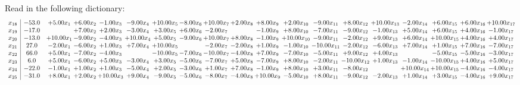 \documentclass[9pt]{article}
\begin{document}
Read in the following dictionary:
\[\begin{array}{c| c c@{\hskip 2pt} c@{\hskip 2pt} c@{\hskip 2pt} c@{\hskip 2pt} c@{\hskip 2pt} c@{\hskip 2pt} c@{\hskip 2pt} c@{\hskip 2pt} c@{\hskip 2pt} c@{\hskip 2pt} c@{\hskip 2pt} c@{\hskip 2pt} c@{\hskip 2pt} c@{\hskip 2pt} c@{\hskip 2pt} c@{\hskip 2pt} c@{\hskip 2pt} }
 x_{18}   &  -53.0 & +  5.00 x_{1} & +  6.00 x_{2} & -1.00 x_{3} & -9.00 x_{4} & + 10.00 x_{5} & -8.00 x_{6} & + 10.00 x_{7} & +  2.00 x_{8} & +  8.00 x_{9} & +  2.00 x_{10} & -9.00 x_{11} & +  8.00 x_{12} & + 10.00 x_{13} & -2.00 x_{14} & +  6.00 x_{15} & +  6.00 x_{16} & + 10.00 x_{17}\\
 x_{19}   &  -17.0  &   & +  7.00 x_{2} & +  2.00 x_{3} & -3.00 x_{4} & +  3.00 x_{5} & +  6.00 x_{6} & -2.00 x_{7} &   & -1.00 x_{9} & +  8.00 x_{10} & -7.00 x_{11} & -9.00 x_{12} & -1.00 x_{13} & +  5.00 x_{14} & +  6.00 x_{15} & +  4.00 x_{16} & -1.00 x_{17}\\
 x_{20}   &  -13.0 & + 10.00 x_{1} & -9.00 x_{2} & -4.00 x_{3} & + 10.00 x_{4} & +  5.00 x_{5} & -9.00 x_{6} & + 10.00 x_{7} & +  8.00 x_{8} & -1.00 x_{9} & + 10.00 x_{10} & -9.00 x_{11} & -2.00 x_{12} & +  9.00 x_{13} & +  6.00 x_{14} & + 10.00 x_{15} & +  4.00 x_{16} & +  4.00 x_{17}\\
 x_{21}   &  27.0 & -2.00 x_{1} & -6.00 x_{2} & +  1.00 x_{3} & +  7.00 x_{4} & + 10.00 x_{5} &   & -2.00 x_{7} & -2.00 x_{8} & +  1.00 x_{9} & -1.00 x_{10} & -10.00 x_{11} & -2.00 x_{12} & -6.00 x_{13} & +  7.00 x_{14} & +  1.00 x_{15} & +  7.00 x_{16} & -7.00 x_{17}\\
 x_{22}   &  66.0 & +  5.00 x_{1} & -7.00 x_{2} & -4.00 x_{3} &   & -10.00 x_{5} & -7.00 x_{6} & -10.00 x_{7} & -4.00 x_{8} & +  7.00 x_{9} & -7.00 x_{10} & -5.00 x_{11} & +  9.00 x_{12} & +  4.00 x_{13} &   & -5.00 x_{15} & -5.00 x_{16} & -3.00 x_{17}\\
 x_{23}   &  6.0 & +  5.00 x_{1} & -6.00 x_{2} & +  5.00 x_{3} & -3.00 x_{4} & +  3.00 x_{5} & -5.00 x_{6} & -7.00 x_{7} & +  5.00 x_{8} & -7.00 x_{9} & +  8.00 x_{10} & -2.00 x_{11} & -10.00 x_{12} & +  1.00 x_{13} & -1.00 x_{14} & -10.00 x_{15} & +  4.00 x_{16} & +  5.00 x_{17}\\
 x_{24}   &  -22.0 & -1.00 x_{1} & +  1.00 x_{2} & +  1.00 x_{3} & -5.00 x_{4} & +  2.00 x_{5} & -3.00 x_{6} & +  1.00 x_{7} & +  7.00 x_{8} & -1.00 x_{9} & +  8.00 x_{10} & +  3.00 x_{11} & -8.00 x_{12} &   & + 10.00 x_{14} & + 10.00 x_{15} & -4.00 x_{16} & -4.00 x_{17}\\
 x_{25}   &  -31.0 & +  8.00 x_{1} & +  2.00 x_{2} & + 10.00 x_{3} & +  9.00 x_{4} & -9.00 x_{5} & -5.00 x_{6} & -8.00 x_{7} & -4.00 x_{8} & + 10.00 x_{9} & -5.00 x_{10} & +  8.00 x_{11} & -9.00 x_{12} & -2.00 x_{13} & +  1.00 x_{14} & +  3.00 x_{15} & -4.00 x_{16} & +  9.00 x_{17}\\

\end{array}\]
\end{document}
